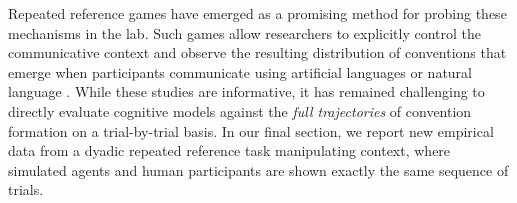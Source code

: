 Repeated reference games have emerged as a promising method for probing these mechanisms in the lab. 
Such games allow researchers to  explicitly control the communicative context and observe the resulting distribution of conventions that emerge when participants communicate using artificial languages \cite{WintersKirbySmith14_LanguagesAdapt, KirbyTamarizCornishSmith15_CompressionCommunication,winters2018contextual} or natural language \cite{hawkins2020characterizing}.
While these studies are informative, it has remained challenging to directly evaluate cognitive models against the \emph{full trajectories} of convention formation on a trial-by-trial basis.
In our final section, we report new empirical data from a dyadic repeated reference task manipulating context, where simulated agents and human participants are shown exactly the same sequence of trials.

